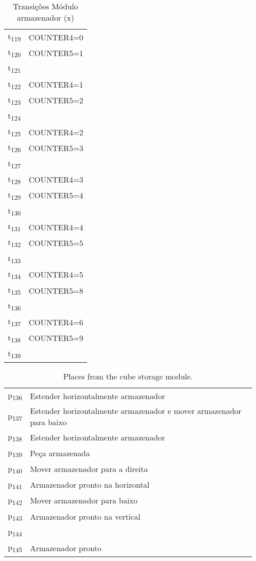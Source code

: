 \begin{table}[htbp]
\caption{Transições Módulo armazenador (x)}
\centering
\begin{tabular}{ll}
t\textsubscript{119} & COUNTER4=0\\
t\textsubscript{120} & COUNTER5=1\\
t\textsubscript{121} & \\
t\textsubscript{122} & COUNTER4=1\\
t\textsubscript{123} & COUNTER5=2\\
t\textsubscript{124} & \\
t\textsubscript{125} & COUNTER4=2\\
t\textsubscript{126} & COUNTER5=3\\
t\textsubscript{127} & \\
t\textsubscript{128} & COUNTER4=3\\
t\textsubscript{129} & COUNTER5=4\\
t\textsubscript{130} & \\
t\textsubscript{131} & COUNTER4=4\\
t\textsubscript{132} & COUNTER5=5\\
t\textsubscript{133} & \\
t\textsubscript{134} & COUNTER4=5\\
t\textsubscript{135} & COUNTER5=8\\
t\textsubscript{136} & \\
t\textsubscript{137} & COUNTER4=6\\
t\textsubscript{138} & COUNTER5=9\\
t\textsubscript{139} & \\
\end{tabular}
\end{table}
\begin{table}[htbp]
\caption{Places from the cube storage module.}
\centering
\begin{tabular}{ll}
p\textsubscript{136} & Estender horizontalmente armazenador\\
p\textsubscript{137} & Estender horizontalmente armazenador e mover armazenador para baixo\\
p\textsubscript{138} & Estender horizontalmente armazenador\\
p\textsubscript{139} & Peça armazenada\\
p\textsubscript{140} & Mover armazenador para a direita\\
p\textsubscript{141} & Armazenador pronto na horizontal\\
p\textsubscript{142} & Mover armazenador para baixo\\
p\textsubscript{143} & Armazenador pronto na vertical\\
p\textsubscript{144} & \\
p\textsubscript{145} & Armazenador pronto\\
\end{tabular}
\end{table}

